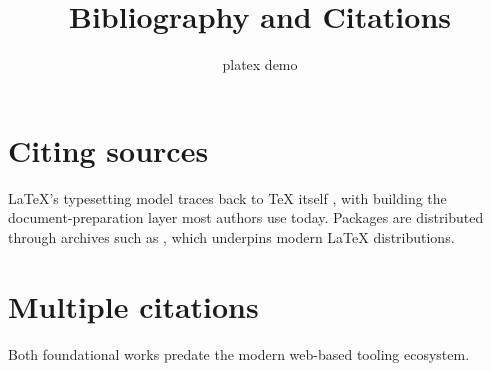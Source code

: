 \documentclass{article}
\title{Bibliography and Citations}
\author{platex demo}
\date{}
\begin{document}
\maketitle

\section{Citing sources}
LaTeX's typesetting model traces back to \TeX{} itself \cite{knuth1984texbook},
with \cite{lamport1994latex} building the document-preparation layer most
authors use today. Packages are distributed through archives such as
\cite{ctan2023}, which underpins modern LaTeX distributions.

\section{Multiple citations}
Both foundational works \cite{knuth1984texbook, lamport1994latex} predate the
modern web-based tooling ecosystem.



\end{document}
